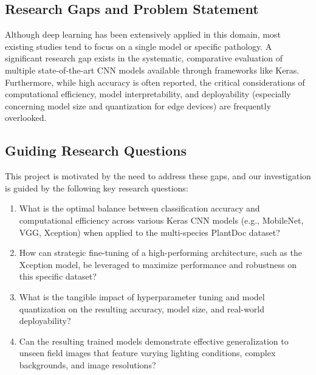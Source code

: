 \documentclass[12pt, a4paper]{report}
\begin{document}
\subsection*{Research Gaps and Problem Statement}
\noindent %
Although deep learning has been extensively applied in this domain, most existing studies tend to focus on a single model or specific pathology. A significant research gap exists in the systematic, comparative evaluation of multiple state-of-the-art CNN models available through frameworks like Keras. Furthermore, while high accuracy is often reported, the critical considerations of computational efficiency, model interpretability, and deployability (especially concerning model size and quantization for edge devices) are frequently overlooked.

\subsection*{Guiding Research Questions}
\noindent %
This project is motivated by the need to address these gaps, and our investigation is guided by the following key research questions:
\begin{enumerate}
    \item What is the optimal balance between classification accuracy and computational efficiency across various Keras CNN models (e.g., MobileNet, VGG, Xception) when applied to the multi-species PlantDoc dataset?
    \item How can strategic fine-tuning of a high-performing architecture, such as the Xception model, be leveraged to maximize performance and robustness on this specific dataset?
    \item What is the tangible impact of hyperparameter tuning and model quantization on the resulting accuracy, model size, and real-world deployability?
    \item Can the resulting trained models demonstrate effective generalization to unseen field images that feature varying lighting conditions, complex backgrounds, and image resolutions?
\end{enumerate}
\end{document}

